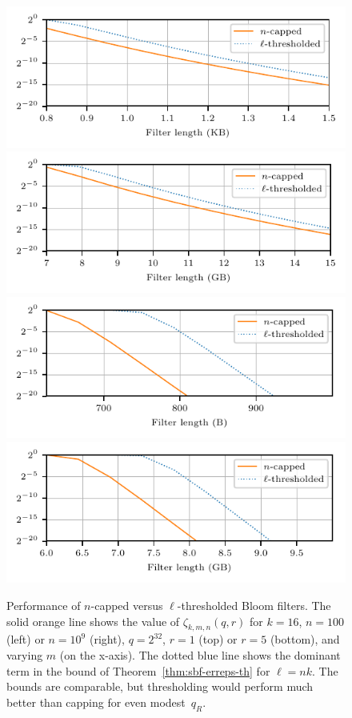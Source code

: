 \begin{figure}
  \begin{center}
  \hspace*{-10pt}
  \includegraphics[scale=0.8]{fig/bf-th-small}
  \includegraphics[scale=0.8]{fig/bf-th}
  \includegraphics[scale=0.8]{fig/bf-th-online}
  \includegraphics[scale=0.8]{fig/bf-th-big-online}
  \end{center}
  \caption{
    Performance of $n$-capped versus $\ell$-thresholded Bloom
    filters. The solid orange line shows the value of $\zeta_{k,m,n}(q,r)$ for
    $k=16$, $n=100$ (left) or $n=10^9$ (right), $q=2^{32}$, $r=1$ (top) or $r = 5$ (bottom), and varying $m$ (on the x-axis).
    The dotted blue line shows the dominant term in the bound of
    Theorem~\ref{thm:sbf-erreps-th} for $\ell=nk$. The bounds are comparable,
    but thresholding would perform much better than capping for even
    modest~$q_R$.
  }
  \label{fig:bf-th}
\end{figure}
